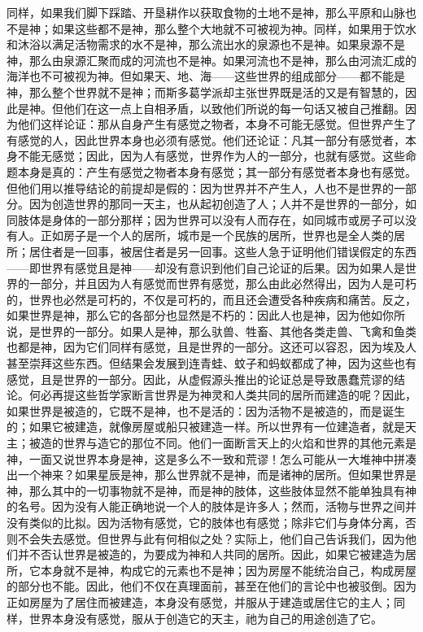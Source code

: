 同样，如果我们脚下踩踏、开垦耕作以获取食物的土地不是神，那么平原和山脉也不是神；如果这些都不是神，那么整个大地就不可被视为神。同样，如果用于饮水和沐浴以满足活物需求的水不是神，那么流出水的泉源也不是神。如果泉源不是神，那么由泉源汇聚而成的河流也不是神。如果河流也不是神，那么由河流汇成的海洋也不可被视为神。但如果天、地、海——这些世界的组成部分——都不能是神，那么整个世界就不是神；而斯多葛学派却主张世界既是活的又是有智慧的，因此是神。但他们在这一点上自相矛盾，以致他们所说的每一句话又被自己推翻。因为他们这样论证：那从自身产生有感觉之物者，本身不可能无感觉。但世界产生了有感觉的人，因此世界本身也必须有感觉。他们还论证：凡其一部分有感觉者，本身不能无感觉；因此，因为人有感觉，世界作为人的一部分，也就有感觉。这些命题本身是真的：产生有感觉之物者本身有感觉；其一部分有感觉者本身也有感觉。但他们用以推导结论的前提却是假的：因为世界并不产生人，人也不是世界的一部分。因为创造世界的那同一天主，也从起初创造了人；人并不是世界的一部分，如同肢体是身体的一部分那样；因为世界可以没有人而存在，如同城市或房子可以没有人。正如房子是一个人的居所，城市是一个民族的居所，世界也是全人类的居所；居住者是一回事，被居住者是另一回事。这些人急于证明他们错误假定的东西——即世界有感觉且是神——却没有意识到他们自己论证的后果。因为如果人是世界的一部分，并且因为人有感觉而世界有感觉，那么由此必然得出，因为人是可朽的，世界也必然是可朽的，不仅是可朽的，而且还会遭受各种疾病和痛苦。反之，如果世界是神，那么它的各部分也显然是不朽的：因此人也是神，因为他如你所说，是世界的一部分。如果人是神，那么驮兽、牲畜、其他各类走兽、飞禽和鱼类也都是神，因为它们同样有感觉，且是世界的一部分。这还可以容忍，因为埃及人甚至崇拜这些东西。但结果会发展到连青蛙、蚊子和蚂蚁都成了神，因为这些也有感觉，且是世界的一部分。因此，从虚假源头推出的论证总是导致愚蠢荒谬的结论。何必再提这些哲学家断言世界是为神灵和人类共同的居所而建造的呢？因此，如果世界是被造的，它既不是神，也不是活的：因为活物不是被造的，而是诞生的；如果它被建造，就像房屋或船只被建造一样。所以世界有一位建造者，就是天主；被造的世界与造它的那位不同。他们一面断言天上的火焰和世界的其他元素是神，一面又说世界本身是神，这是多么不一致和荒谬！怎么可能从一大堆神中拼凑出一个神来？如果星辰是神，那么世界就不是神，而是诸神的居所。但如果世界是神，那么其中的一切事物就不是神，而是神的肢体，这些肢体显然不能单独具有神的名号。因为没有人能正确地说一个人的肢体是许多人；然而，活物与世界之间并没有类似的比拟。因为活物有感觉，它的肢体也有感觉；除非它们与身体分离，否则不会失去感觉。但世界与此有何相似之处？实际上，他们自己告诉我们，因为他们并不否认世界是被造的，为要成为神和人共同的居所。因此，如果它被建造为居所，它本身就不是神，构成它的元素也不是神；因为房屋不能统治自己，构成房屋的部分也不能。因此，他们不仅在真理面前，甚至在他们的言论中也被驳倒。因为正如房屋为了居住而被建造，本身没有感觉，并服从于建造或居住它的主人；同样，世界本身没有感觉，服从于创造它的天主，祂为自己的用途创造了它。\par

